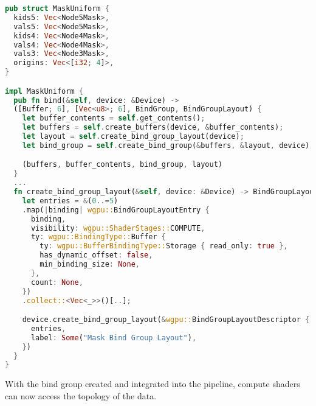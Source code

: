 \begin{lstlisting}[language=rust, captionpos=b, caption={
    \texttt{MaskUniform} definition: Each type of mask list is a separate binding. An additional binding is created to store the origins of the top-level Node5 nodes.
    \texttt{MaskUniform} implementation: The \texttt{bind} method generates all data needed to pass the mask group to compute shaders. The \texttt{create\_bind\_group\_layout}
    function is the critical part of this process; each binding is a storage buffer type with read-only access.
}]
pub struct MaskUniform {
  kids5: Vec<Node5Mask>,
  vals5: Vec<Node5Mask>,
  kids4: Vec<Node4Mask>,
  vals4: Vec<Node4Mask>,
  vals3: Vec<Node3Mask>,
  origins: Vec<[i32; 4]>,
}

impl MaskUniform {
  pub fn bind(&self, device: &Device) ->
  ([Buffer; 6], [Vec<u8>; 6], BindGroup, BindGroupLayout) {
    let buffer_contents = self.get_contents();
    let buffers = self.create_buffers(device, &buffer_contents);
    let layout = self.create_bind_group_layout(device);
    let bind_group = self.create_bind_group(&buffers, &layout, device);

    (buffers, buffer_contents, bind_group, layout)
  }
  ...
  fn create_bind_group_layout(&self, device: &Device) -> BindGroupLayout {
    let entries = &(0..=5)
    .map(|binding| wgpu::BindGroupLayoutEntry {
      binding,
      visibility: wgpu::ShaderStages::COMPUTE,
      ty: wgpu::BindingType::Buffer {
        ty: wgpu::BufferBindingType::Storage { read_only: true },
        has_dynamic_offset: false,
        min_binding_size: None,
      },
      count: None,
    })
    .collect::<Vec<_>>()[..];

    device.create_bind_group_layout(&wgpu::BindGroupLayoutDescriptor {
      entries,
      label: Some("Mask Bind Group Layout"),
    })
  }
}
\end{lstlisting}

    With the bind group created and integrated into the pipeline, compute shaders can now access the topology of the data.

